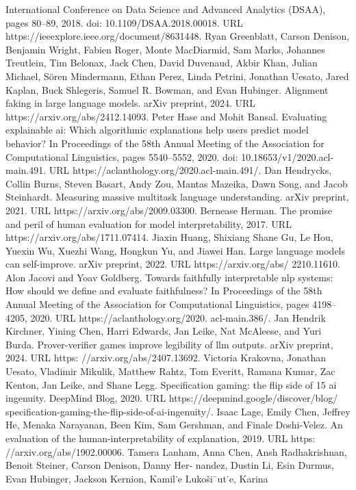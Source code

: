 International Conference on Data Science and Advanced Analytics (DSAA), pages 80–89, 2018.
doi: 10.1109/DSAA.2018.00018. URL https://ieeexplore.ieee.org/document/8631448.
Ryan Greenblatt, Carson Denison, Benjamin Wright, Fabien Roger, Monte MacDiarmid, Sam Marks,
Johannes Treutlein, Tim Belonax, Jack Chen, David Duvenaud, Akbir Khan, Julian Michael,
Sören Mindermann, Ethan Perez, Linda Petrini, Jonathan Uesato, Jared Kaplan, Buck Shlegeris,
Samuel R. Bowman, and Evan Hubinger. Alignment faking in large language models. arXiv
preprint, 2024. URL https://arxiv.org/abs/2412.14093.
Peter Hase and Mohit Bansal. Evaluating explainable ai: Which algorithmic explanations help
users predict model behavior? In Proceedings of the 58th Annual Meeting of the Association for
Computational Linguistics, pages 5540–5552, 2020. doi: 10.18653/v1/2020.acl-main.491. URL
https://aclanthology.org/2020.acl-main.491/.
Dan Hendrycks, Collin Burns, Steven Basart, Andy Zou, Mantas Mazeika, Dawn Song, and Jacob
Steinhardt. Measuring massive multitask language understanding. arXiv preprint, 2021. URL
https://arxiv.org/abs/2009.03300.
Bernease Herman. The promise and peril of human evaluation for model interpretability, 2017. URL
https://arxiv.org/abs/1711.07414.
Jiaxin Huang, Shixiang Shane Gu, Le Hou, Yuexin Wu, Xuezhi Wang, Hongkun Yu, and Jiawei Han.
Large language models can self-improve. arXiv preprint, 2022. URL https://arxiv.org/abs/
2210.11610.
Alon Jacovi and Yoav Goldberg. Towards faithfully interpretable nlp systems: How should we define
and evaluate faithfulness? In Proceedings of the 58th Annual Meeting of the Association for
Computational Linguistics, pages 4198–4205, 2020. URL https://aclanthology.org/2020.
acl-main.386/.
Jan Hendrik Kirchner, Yining Chen, Harri Edwards, Jan Leike, Nat McAleese, and Yuri Burda.
Prover-verifier games improve legibility of llm outputs. arXiv preprint, 2024. URL https:
//arxiv.org/abs/2407.13692.
Victoria Krakovna, Jonathan Uesato, Vladimir Mikulik, Matthew Rahtz, Tom Everitt, Ramana
Kumar, Zac Kenton, Jan Leike, and Shane Legg.
Specification gaming: the flip side of
15
ai ingenuity.
DeepMind Blog, 2020.
URL https://deepmind.google/discover/blog/
specification-gaming-the-flip-side-of-ai-ingenuity/.
Isaac Lage, Emily Chen, Jeffrey He, Menaka Narayanan, Been Kim, Sam Gershman, and Finale
Doshi-Velez. An evaluation of the human-interpretability of explanation, 2019. URL https:
//arxiv.org/abs/1902.00006.
Tamera Lanham, Anna Chen, Ansh Radhakrishnan, Benoit Steiner, Carson Denison, Danny Her-
nandez, Dustin Li, Esin Durmus, Evan Hubinger, Jackson Kernion, Kamil˙e Lukoši¯ut˙e, Karina
